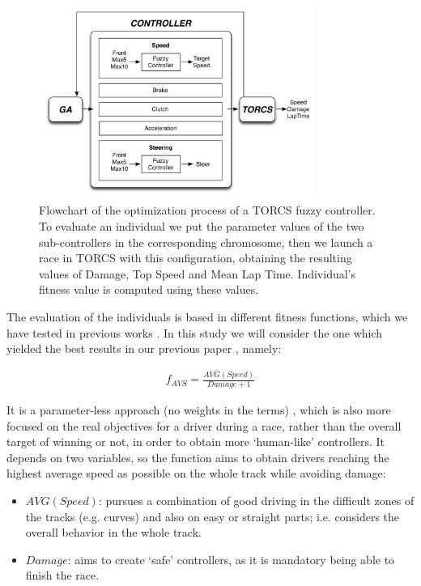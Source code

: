 \documentclass[10pt,journal,compsoc]{IEEEtran}
\begin{document}
\begin{figure}[!ht]
	\label{fig:ga}
	\begin{center}
		\includegraphics[width=9cm]{fig/flowchart}
	\end{center}
	\caption{Flowchart of  the optimization process of a TORCS fuzzy controller. To evaluate an individual we put the parameter values of the two sub-controllers in the corresponding chromosome, then we launch a race in TORCS with this configuration, obtaining the resulting values of Damage, Top Speed and Mean Lap Time. Individual's fitness value is computed using these values.}
\end{figure}

The evaluation of the individuals is based in different fitness functions, which we have tested in previous works \cite{salem_evo18}. In this study we will consider the one which yielded the best results in our previous paper \cite{salem_cig2018}, namely:

\begin{equation} \label{fit2}
	\begin{array}{lll}
		f_{AVS}= \frac{AVG(Speed)}{Damage+1}
	\end{array}
\end{equation}	

It is a parameter-less approach (no weights in the terms) \cite{Harik-ParameterLess99}, which is also more focused on the real objectives for a driver during a race, rather than the overall target of winning or not,
in order to obtain more `human-like' controllers. It depends on two variables, so the function aims to obtain drivers reaching the highest average speed as possible on the whole track while avoiding damage:

\begin{itemize}
	\item $AVG(Speed)$: pursues a combination of good driving in the difficult zones of the tracks (e.g. curves) and also on easy or straight parts; i.e. considers the overall behavior in the whole track.
	\item $Damage$: aims to create `safe' controllers, as it is mandatory being able to finish the race.
\end{itemize} 
\end{document}
